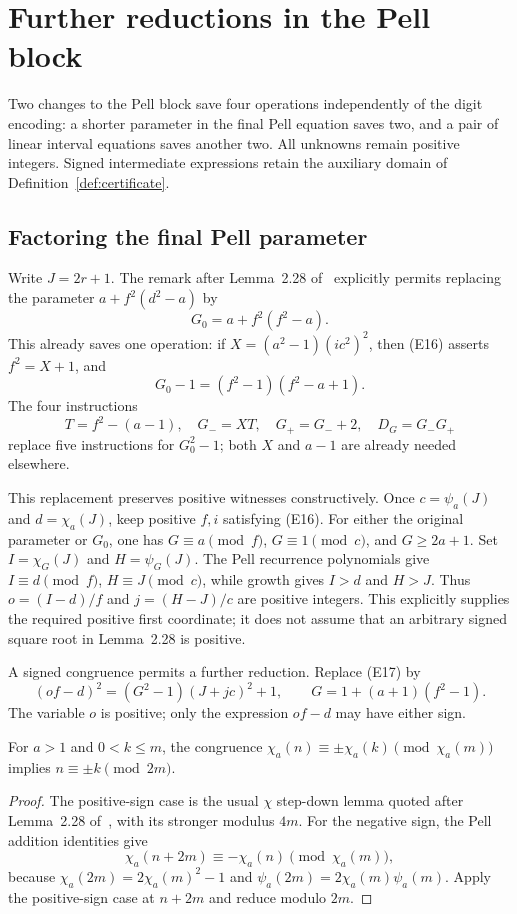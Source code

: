\section{Further reductions in the Pell block}\label{sec:further-pell}

Two changes to the Pell block save four operations independently of the
digit encoding: a shorter parameter in the final Pell equation saves two,
and a pair of linear interval equations saves another two. All unknowns
remain positive integers. Signed intermediate expressions retain the
auxiliary domain of Definition~\ref{def:certificate}.

\subsection{Factoring the final Pell parameter}

Write $J=2r+1$. The remark after Lemma~2.28 of~\cite{J82} explicitly
permits replacing the parameter $a+f^2(d^2-a)$ by
\[
 G_0=a+f^2(f^2-a).
\]
This already saves one operation: if $X=(a^2-1)(ic^2)^2$, then (E16)
asserts $f^2=X+1$, and
\[
 G_0-1=(f^2-1)(f^2-a+1).
\]
The four instructions
\[
 T=f^2-(a-1),\quad G_-=XT,\quad G_+=G_-+2,
 \quad D_G=G_-G_+
\]
replace five instructions for $G_0^2-1$; both $X$ and $a-1$ are already
needed elsewhere.

This replacement preserves positive witnesses constructively. Once
$c=\psi_a(J)$ and $d=\chi_a(J)$, keep positive $f,i$ satisfying (E16).
For either the original parameter or $G_0$, one has
$G\equiv a\pmod f$, $G\equiv1\pmod c$, and $G\ge2a+1$.
Set $I=\chi_G(J)$ and $H=\psi_G(J)$. The Pell recurrence polynomials give
$I\equiv d\pmod f$, $H\equiv J\pmod c$, while growth gives $I>d$ and
$H>J$. Thus $o=(I-d)/f$ and $j=(H-J)/c$ are positive integers.
This explicitly supplies the required positive first coordinate; it does
not assume that an arbitrary signed square root in Lemma~2.28 is positive.

A signed congruence permits a further reduction. Replace (E17) by
\begin{equation}\label{eq:signed-pell-new}
 (of-d)^2=(G^2-1)(J+jc)^2+1,
 \qquad G=1+(a+1)(f^2-1).
\end{equation}
The variable $o$ is positive; only the expression $of-d$ may have either
sign.

\begin{lemma}\label{lem:signed-chi-new}
For $a>1$ and $0<k\le m$, the congruence
$\chi_a(n)\equiv\pm\chi_a(k)\pmod{\chi_a(m)}$ implies
$n\equiv\pm k\pmod{2m}$.
\end{lemma}
\begin{proof}
The positive-sign case is the usual $\chi$ step-down lemma quoted after
Lemma~2.28 of~\cite{J82}, with its stronger modulus $4m$. For the negative
sign, the Pell addition identities give
\[
 \chi_a(n+2m)\equiv-\chi_a(n)\pmod{\chi_a(m)},
\]
because $\chi_a(2m)=2\chi_a(m)^2-1$ and
$\psi_a(2m)=2\chi_a(m)\psi_a(m)$. Apply the positive-sign case at
$n+2m$ and reduce modulo $2m$.
\end{proof}

